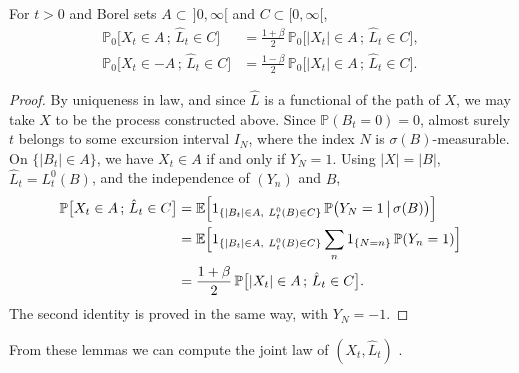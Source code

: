 \begin{lemma}\label{lem:sbm-flip}
	For $t>0$ and Borel sets $A\subset\,]0,\infty[$ and $C\subset[0,\infty[$,
	\begin{align*}
		\mathbb{P}_0\bigl[X_t\in A\,;\,\hat{L}_t\in C\bigr]
		 & = \frac{1+\beta}{2}\,\mathbb{P}_0\bigl[|X_t|\in A\,;\,\hat{L}_t\in C\bigr], \\
		\mathbb{P}_0\bigl[X_t\in -A\,;\,\hat{L}_t\in C\bigr]
		 & = \frac{1-\beta}{2}\,\mathbb{P}_0\bigl[|X_t|\in A\,;\,\hat{L}_t\in C\bigr].
	\end{align*}
\end{lemma}
\begin{proof}
	By uniqueness in law, and since $\hat{L}$ is a functional of the path of
	$X$, we may take $X$ to be the process constructed above. Since
	$\mathbb{P}(B_t = 0) = 0$, almost surely $t$ belongs to some excursion
	interval $I_{N}$, where the index $N$ is $\sigma(B)$-measurable. On
	$\{|B_t|\in A\}$, we have $X_t\in A$ if and only if $Y_N = 1$. Using
	$|X| = |B|$, $\hat{L}_t = L^0_t(B)$, and the independence of $(Y_n)$ and
	$B$,
	\begin{align*}
		\mathbb{P}\bigl[X_t\in A\,;\,\hat{L}_t\in C\bigr]
		 & = \mathbb{E}\Bigl[1_{\{|B_t|\in A,\ L^0_t(B)\in C\}}\,
		\mathbb{P}\bigl(Y_N = 1\,\big|\,\sigma(B)\bigr)\Bigr]                                   \\
		 & = \mathbb{E}\Bigl[1_{\{|B_t|\in A,\ L^0_t(B)\in C\}}\sum_{n}1_{\{N=n\}}\,\mathbb{P}(Y_n=1)\Bigr] \\
		 & = \frac{1+\beta}{2}\,\mathbb{P}\bigl[|X_t|\in A\,;\,\hat{L}_t\in C\bigr].
	\end{align*}
	The second identity is proved in the same way, with $Y_N = -1$.
\end{proof}

From these lemmas we can compute the joint law of $(X_t,\hat{L}_t)$
\citep{EtoreMartinez2012}.

